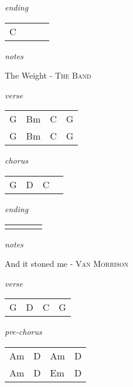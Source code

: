 \documentclass[12pt]{article}
\begin{document}
\textit{ending}

\begin{tabular}{|P{1.25in}|P{1.25in}|P{1.25in}|P{1.25in}|}
  C &   &   &   \\
\end{tabular}

\textit{notes}



\newpage

{\Huge The Weight} {\huge - \textsc{The Band}}

\huge
\textit{verse}

\begin{tabular}{|P{1.25in}|P{1.25in}|P{1.25in}|P{1.25in}|}
  G  & Bm  & C  &  G \\
  G  & Bm  & C  &  G \\
\end{tabular}

\textit{chorus}

\begin{tabular}{|P{1.25in}|P{1.25in}|P{1.25in}|P{1.25in}|}
  G  &  D &  C &   \\
\end{tabular}

\textit{ending}

\begin{tabular}{|P{1.25in}|P{1.25in}|P{1.25in}|P{1.25in}|}
    &   &   &   \\
\end{tabular}

\textit{notes}

\newpage

{\Huge And it stoned me} {\huge - \textsc{Van Morrison}}

\huge


\textit{verse}

\begin{tabular}{|P{1.25in}|P{1.25in}|P{1.25in}|P{1.25in}|}
  G  &  D &  C &  G \\
\end{tabular}

\textit{pre-chorus}

\begin{tabular}{|P{1.25in}|P{1.25in}|P{1.25in}|P{1.25in}|}
  Am  &  D & Am  & D  \\
  Am  &  D & Em  & D  \\
\end{tabular}
\end{document}
